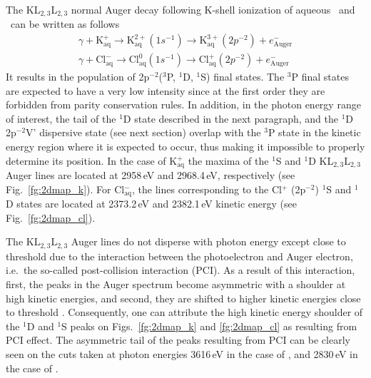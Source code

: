 The KL$_{2,3}$L$_{2,3}$ normal Auger decay following K-shell ionization of aqueous \ki~and \cli~can be written as follows
%
\begin{align*}
\gamma + \text{K}^{+}_{\text{aq}} \rightarrow \text{K}^{2+}_{\text{aq}} (1s^{-1}) \rightarrow \text{K}^{3+}_{\text{aq}} (2p^{-2}) + e^{-}_{\text{Auger}}\\
\gamma + \text{Cl}^{-}_{\text{aq}} \rightarrow \text{Cl}^{0}_{\text{aq}} (1s^{-1}) \rightarrow \text{Cl}^{+}_{\text{aq}}(2p^{-2}) + e^{-}_{\text{Auger}}
\end{align*}
%
It results in the population of 2p$^{-2}$($^3$P, $^1$D, $^1$S) final states. 
The $^3$P final states are expected to have a very low intensity since at the first order they are forbidden from parity conservation rules. In addition, in the photon energy range of interest, the tail of the $^1$D state described in the next paragraph, and the $^1$D 2p$^{-2}$V' dispersive state (see next section) overlap with the $^3$P state in the kinetic energy region where it is expected to occur, thus making it impossible to properly determine its position. In the case of K$^{+}_{\text{aq}}$ the maxima of the $^1$S and $^1$D KL$_{2,3}$L$_{2,3}$ Auger lines are located at 2958\,eV and 2968.4\,eV, respectively (see Fig.\ \ref{fg:2dmap_k}). For Cl$^{-}_{\text{aq}}$, the lines corresponding to the Cl$^{+}$ (2p$^{-2}$) $^1$S and $^1$D states are located at 2373.2\,eV and 2382.1\,eV kinetic energy (see Fig.\ \ref{fg:2dmap_cl}).


The KL$_{2,3}$L$_{2,3}$ Auger lines do not disperse with photon energy except close to threshold due to the interaction between the photoelectron and Auger electron, i.e.\ the so-called post-collision interaction (PCI). As a result of this interaction, first, the peaks in the Auger spectrum become asymmetric with a shoulder at high kinetic energies, and second, they are shifted to higher kinetic energies close to threshold \citep{russek86:911,guillemin15:012503}. Consequently, one can attribute the high kinetic energy shoulder of the $^1$D and $^1$S peaks on Figs.\ \ref{fg:2dmap_k} and \ref{fg:2dmap_cl} as resulting from PCI effect. The asymmetric tail of the peaks resulting from PCI can be clearly seen on the cuts taken at photon energies 3616\,eV in the case of \ki, and 2830\,eV in the case of \cli.


